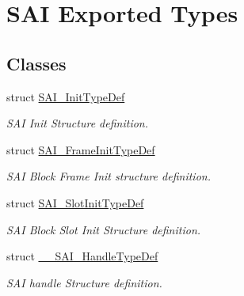 \hypertarget{group___s_a_i___exported___types}{}\section{S\+AI Exported Types}
\label{group___s_a_i___exported___types}
\subsection*{Classes}
\begin{DoxyCompactItemize}
\item 
struct \hyperlink{struct_s_a_i___init_type_def}{S\+A\+I\+\_\+\+Init\+Type\+Def}
\begin{DoxyCompactList}\small\item\em S\+AI Init Structure definition. \end{DoxyCompactList}\item 
struct \hyperlink{struct_s_a_i___frame_init_type_def}{S\+A\+I\+\_\+\+Frame\+Init\+Type\+Def}
\begin{DoxyCompactList}\small\item\em S\+AI Block Frame Init structure definition. \end{DoxyCompactList}\item 
struct \hyperlink{struct_s_a_i___slot_init_type_def}{S\+A\+I\+\_\+\+Slot\+Init\+Type\+Def}
\begin{DoxyCompactList}\small\item\em S\+AI Block Slot Init Structure definition. \end{DoxyCompactList}\item 
struct \hyperlink{struct_____s_a_i___handle_type_def}{\+\_\+\+\_\+\+S\+A\+I\+\_\+\+Handle\+Type\+Def}
\begin{DoxyCompactList}\small\item\em S\+AI handle Structure definition. \end{DoxyCompactList}\end{DoxyCompactItemize}
